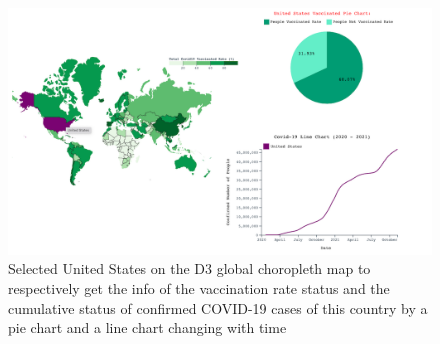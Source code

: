 \documentclass[runningheads]{llncs}
\begin{document}
\begin{figure}
\includegraphics[width=\textwidth]{health3.png}
\caption{Selected United States on the D3 global choropleth map to respectively get the info of the vaccination rate status and the cumulative status of confirmed COVID-19 cases of this country by a pie chart and a line chart changing with time} \label{fig1}
\end{figure}




%
\end{document}
